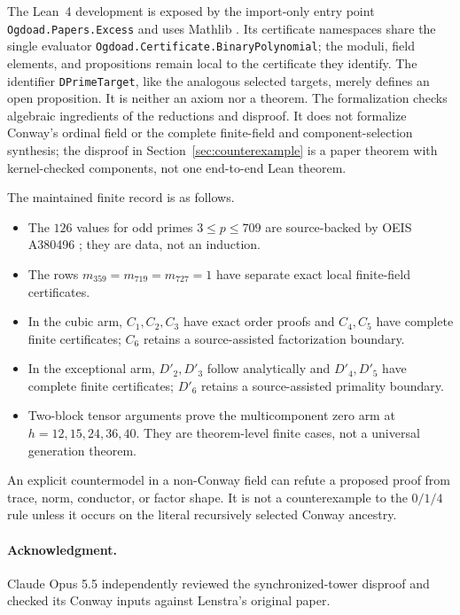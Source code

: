 \documentclass[11pt]{article}
\theoremstyle{definition}
\theoremstyle{remark}
\begin{document}
The Lean~4 \cite{demouraullrich2021} development is exposed by the import-only
entry point
\texttt{Ogdoad.Papers.}\allowbreak\texttt{Excess} and uses Mathlib
\cite{mathlib2020}.  Its certificate namespaces share the single evaluator
\texttt{Ogdoad.Certificate.}\allowbreak\texttt{BinaryPolynomial}; the
moduli, field elements, and propositions remain local to the certificate they
identify.  The identifier \texttt{DPrimeTarget}, like the analogous selected
targets, merely defines an open proposition.  It is neither an axiom nor a
theorem.  The formalization checks algebraic ingredients of the reductions and
disproof.  It does not formalize Conway's ordinal field or the complete
finite-field and component-selection synthesis; the disproof in
Section~\ref{sec:counterexample} is a paper theorem with kernel-checked
components, not one end-to-end Lean theorem.

The maintained finite record is as follows.
\begin{itemize}
\item The $126$ values for odd primes $3\leq p\leq709$ are source-backed by
      OEIS A380496 \cite{oeisA380496}; they are data, not an induction.
\item The rows $m_{359}=m_{719}=m_{727}=1$ have separate exact local
      finite-field certificates.
\item In the cubic arm, $C_1,C_2,C_3$ have exact order proofs and
      $C_4,C_5$ have complete finite certificates; $C_6$ retains a
      source-assisted factorization boundary.
\item In the exceptional arm, $D'_2,D'_3$ follow analytically and
      $D'_4,D'_5$ have complete finite certificates; $D'_6$ retains a
      source-assisted primality boundary.
\item Two-block tensor arguments prove the multicomponent zero arm at
      $h=12,15,24,36,40$.  They are theorem-level finite cases, not a
      universal generation theorem.
\end{itemize}

An explicit countermodel in a non-Conway field can refute a proposed proof
from trace, norm, conductor, or factor shape.  It is not a counterexample to
the $0/1/4$ rule unless it occurs on the literal recursively selected Conway
ancestry.

\paragraph{Acknowledgment.}
Claude Opus 5.5 independently reviewed the synchronized-tower disproof and
checked its Conway inputs against Lenstra's original paper.
\end{document}
